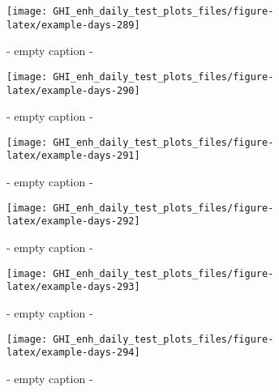 \documentclass[
  10pt,
  a4paper,oneside]{article}
\begin{document}
\begin{figure}[H]

{\centering \texttt{[image: GHI\_enh\_daily\_test\_plots\_files/figure-latex/example-days-289]} 

}

\caption{ - empty caption - }\label{fig:example-days-289}
\end{figure}

\begin{figure}[H]

{\centering \texttt{[image: GHI\_enh\_daily\_test\_plots\_files/figure-latex/example-days-290]} 

}

\caption{ - empty caption - }\label{fig:example-days-290}
\end{figure}

\begin{figure}[H]

{\centering \texttt{[image: GHI\_enh\_daily\_test\_plots\_files/figure-latex/example-days-291]} 

}

\caption{ - empty caption - }\label{fig:example-days-291}
\end{figure}

\begin{figure}[H]

{\centering \texttt{[image: GHI\_enh\_daily\_test\_plots\_files/figure-latex/example-days-292]} 

}

\caption{ - empty caption - }\label{fig:example-days-292}
\end{figure}

\begin{figure}[H]

{\centering \texttt{[image: GHI\_enh\_daily\_test\_plots\_files/figure-latex/example-days-293]} 

}

\caption{ - empty caption - }\label{fig:example-days-293}
\end{figure}

\begin{figure}[H]

{\centering \texttt{[image: GHI\_enh\_daily\_test\_plots\_files/figure-latex/example-days-294]} 

}

\caption{ - empty caption - }\label{fig:example-days-294}
\end{figure}
\end{document}
